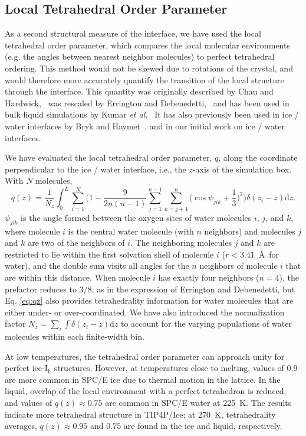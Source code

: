 \subsection{Local Tetrahedral Order Parameter}
As a second structural measure of the interface, we have used the
local tetrahedral order parameter, which compares the local molecular
environments (e.g. the angles between nearest neighbor molecules) to
perfect tetrahedral ordering. This method would not be skewed due to
rotations of the crystal, and would therefore more accurately quantify
the transition of the local structure through the interface. This
quantity was originally described by Chau and
Hardwick,~\cite{Chau1998} was rescaled by Errington and
Debenedetti,~\cite{Errington2001} and has been used in bulk liquid
simulations by Kumar \textit{et al.}~\cite{Kumar2009} It has also
previously been used in ice / water interfaces by Bryk and
Haymet~\cite{Bryk2004}, and in our initial work on ice / water
interfaces\cite{Louden2013a}.

We have evaluated the local tetrahedral order parameter, $q$, along
the coordinate perpendicular to the ice / water interface, i.e., the
$z$-axis of the simulation box. With $N$ molecules,
\begin{equation}
q(z) = \frac{1}{N_z} \int_0^L \sum_{i=1}^{N} \Bigg(1 -\frac{9}{2n(n-1)}\sum_{j=1}^{n-1}
\sum_{k=j+1}^{n} \bigg(\cos\psi_{jik}+\frac{1}{3}\bigg)^2\Bigg)
\delta(z_{i}-z)\mathrm{d}z .
\label{eq:qz}
\end{equation}
$\psi_{jik}$ is the angle formed between the oxygen sites of water
molecules $i$, $j$, and $k$, where molecule $i$ is the central water
molecule (with $n$ neighbors) and molecules $j$ and $k$ are two of the
neighbors of $i$.  The neighboring molecules $j$ and $k$ are
restricted to lie within the first solvation shell of molecule $i$
($r < 3.41$~\AA\ for water), and the double sum visits all angles for
the $n$ neighbors of molecule $i$ that are within this distance.  When
molecule $i$ has exactly four neighbors ($n=4$), the prefactor reduces
to $3/8$, as in the expression of Errington and Debenedetti, but
Eq. \eqref{eq:qz} also provides tetrahedrality information for water
molecules that are either under- or over-coordinated. We have also
introduced the normalization factor
$N_z = \sum_i \int \delta(z_i - z) \mathrm{d}z$ to account for the
varying populations of water molecules within each finite-width bin.

At low temperatures, the tetrahedral order parameter can approach
unity for perfect ice-I$_\mathrm{h}$ structures. However, at
temperatures close to melting, values of 0.9 are more common in SPC/E
ice due to thermal motion in the lattice. In the liquid, overlap of
the local environment with a perfect tetrahedron is reduced, and
values of $q(z) \approx 0.75$ are common in SPC/E water at 225~K. The
results indicate more tetrahedral structure in TIP4P/Ice; at
270~K, tetrahedrality averages, $q(z) \approx 0.95$ and $0.75$ are
found in the ice and liquid, respectively.

